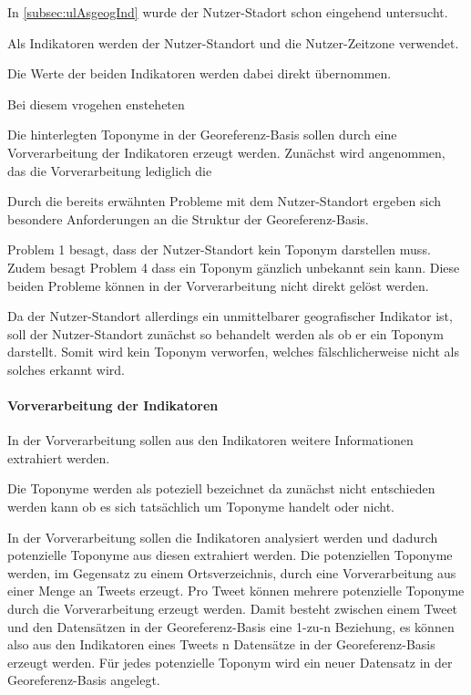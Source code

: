 					

					In \ref{subsec:ulAsgeogInd} wurde der Nutzer-Stadort schon eingehend untersucht. 

					Als Indikatoren werden der Nutzer-Standort und die Nutzer-Zeitzone verwendet.					

					Die Werte der beiden Indikatoren werden dabei direkt übernommen.




					Bei diesem vrogehen ensteheten  





					Die hinterlegten Toponyme in der Georeferenz-Basis sollen durch eine Vorverarbeitung der Indikatoren erzeugt werden.
					Zunächst wird angenommen, das die Vorverarbeitung lediglich die 

					Durch die bereits erwähnten Probleme mit dem Nutzer-Standort ergeben sich besondere Anforderungen an die Struktur der Georeferenz-Basis.

					Problem 1 besagt, dass der Nutzer-Standort kein Toponym darstellen muss.
					Zudem besagt Problem 4 dass ein Toponym gänzlich unbekannt sein kann.
					Diese beiden Probleme können in der Vorverarbeitung nicht direkt gelöst werden.

					Da der Nutzer-Standort allerdings ein unmittelbarer geografischer Indikator ist, soll der Nutzer-Standort zunächst so behandelt werden als ob er ein 
					Toponym darstellt.
					Somit wird kein Toponym verworfen, welches fälschlicherweise nicht als solches erkannt wird. 



				  


				

					\paragraph{Vorverarbeitung der Indikatoren}  
						

						In der Vorverarbeitung sollen aus den Indikatoren weitere Informationen extrahiert werden. 

						Die Toponyme werden als poteziell bezeichnet da zunächst nicht entschieden werden kann ob es sich tatsächlich um Toponyme handelt oder nicht. 

						In der Vorverarbeitung sollen die Indikatoren analysiert werden und dadurch potenzielle Toponyme aus diesen extrahiert werden.
						Die potenziellen Toponyme werden, im Gegensatz zu einem Ortsverzeichnis, durch eine Vorverarbeitung aus einer Menge an Tweets erzeugt. 
						Pro Tweet können mehrere potenzielle Toponyme durch die Vorverarbeitung erzeugt werden.
						Damit besteht zwischen einem Tweet und den Datensätzen in der Georeferenz-Basis eine 1-zu-n Beziehung, es können also aus den Indikatoren eines Tweets n Datensätze in der Georeferenz-Basis erzeugt werden. 
						Für jedes potenzielle Toponym wird ein neuer Datensatz in der Georeferenz-Basis angelegt. 


